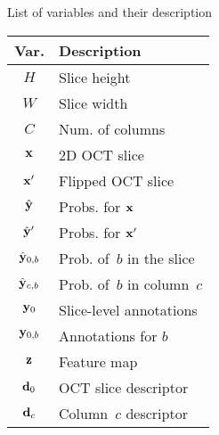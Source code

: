 \begin{margintable}[]\small
\caption{List of variables and their description}
\label{tab:var_list_loc}
\begin{tabular}{@{}cl@{}}
\toprule
{Var.}       & {Description}                                                                                         \\ \midrule
$H$            & Slice height                                                                              \\
$W$            & Slice width                                                                           \\
$C$            & Num. of columns                                              \\
$\mathbf{x}$           & 2D OCT slice                                                                                        \\
$\mathbf{x}'$          & Flipped OCT slice                                                                                \\
$\hat{\mathbf{y}}$        & Probs. for $\mathbf{x}$                                                \\
$\hat{\mathbf{y}}'$       & Probs. for $\mathbf{x}'$                                   \\
$\hat{\mathbf{y}}_{0,b}$  & Prob. of~$b$ in the slice                                              \\
$\hat{\mathbf{y}}_{c, b}$ & Prob. of~$b$ in column~$c$                                                        \\
$\mathbf{y}_0$         & Slice-level annotations                                                                             \\
$\mathbf{y}_{0,b}$     & Annotations for $b$                                                           \\
$\mathbf{z}$           & Feature map                                                                      \\
$\mathbf{d}_0$         & OCT slice descriptor               \\
$\mathbf{d}_c$         & Column~$c$ descriptor    \\ \bottomrule
\end{tabular}
\end{margintable}